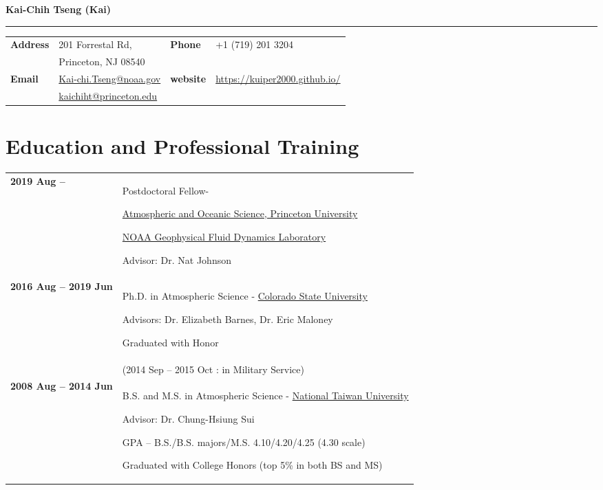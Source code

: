 \documentclass{article}
\begin{document}
{\huge\color{airforceblue}\textbf{Kai-Chih Tseng (Kai)}\par}
\rule{\textwidth}{0.5mm}\par

\vspace{5ex}

\begin{tabular}{
		>{\bfseries}p{.20\linewidth}
		p{.4\linewidth}
		>{\bfseries}p{.1\linewidth}
		p{.25\linewidth}
	}
	Address       & 201 Forrestal Rd,          &  Phone  & +1 (719) 201 3204 \\
	              & Princeton, NJ 08540          &    &  \\
	Email         & \href{mailto:Kai-chi.Tseng@noaa.gov}{Kai-chi.Tseng@noaa.gov} & website & \href{https://kuiper2000.github.io/}{https://kuiper2000.github.io/}    \\
                  & \href{mailto:kaichiht@princeton.edu}{kaichiht@princeton.edu} &       &     \\
\end{tabular}

\section{\color{airforceblue}Education and Professional Training}
\begin{tabular}{>{\bfseries}p{4cm}p{\linewidth-2.5cm\relax}}
	2019  Aug --   & Postdoctoral Fellow- \par
	\href{https://www.princeton.edu/}{Atmospheric and Oceanic Science, Princeton University} \par
	\href{https://www.gfdl.noaa.gov/}{NOAA Geophysical Fluid Dynamics Laboratory}\par
	Advisor: Dr. Nat Johnson \par
    \\
	2016  Aug -- 2019 Jun & Ph.D. in Atmospheric Science -
	\href{https://www.colostate.edu/}{Colorado State University}\par
	Advisors: Dr. Elizabeth Barnes, Dr. Eric Maloney \par
	Graduated with Honor \par
	\\
	 & (2014 Sep -- 2015 Oct : in Military Service) \par
	\\
	2008 Aug -- 2014 Jun & B.S. and M.S. in Atmospheric Science -
	\href{https://www.ntu.edu.tw/}{National Taiwan University}\par
	Advisor: Dr. Chung-Hsiung Sui \par
	GPA -- B.S./B.S. majors/M.S. 4.10/4.20/4.25 (4.30 scale) \par
	Graduated with College Honors (top 5\% in both BS and MS) \par
	

\end{tabular}
\end{document}
